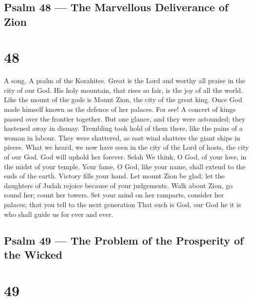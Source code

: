 \hypertarget{psalm-48-the-marvellous-deliverance-of-zion}{%
\subsection{Psalm 48 --- The Marvellous Deliverance of
Zion}\label{psalm-48-the-marvellous-deliverance-of-zion}}

\hypertarget{section-47}{%
\section{48}\label{section-47}}

A song. A psalm of the Korahites.  Great is the Lord and
worthy all praise in the city of our God. His holy mountain,
 that rises so fair, is the joy of all the world. Like the
mount of the gods is Mount Zion, the city of the great king.
 Once God made himself known as the defence of her palaces.
 For see! A concert of kings passed over the frontier
together.  But one glance, and they were astounded; they
hastened away in dismay.  Trembling took hold of them there,
like the pains of a woman in labour.  They were shattered,
as east wind shatters the giant ships in pieces.  What we
heard, we now have seen in the city of the Lord of hosts, the city of
our God. God will uphold her forever. Selah  We think, O
God, of your love, in the midst of your temple.  Your fame,
O God, like your name, shall extend to the ends of the earth. Victory
fills your hand.  Let mount Zion be glad; let the daughters
of Judah rejoice because of your judgements.  Walk about
Zion, go round her; count her towers.  Set your mind on her
ramparts, consider her palaces; that you tell to the next generation
 That such is God, our God he it is who shall guide us for
ever and ever.

\hypertarget{psalm-49-the-problem-of-the-prosperity-of-the-wicked}{%
\subsection{Psalm 49 --- The Problem of the Prosperity of the
Wicked}\label{psalm-49-the-problem-of-the-prosperity-of-the-wicked}}

\hypertarget{section-48}{%
\section{49}\label{section-48}}

